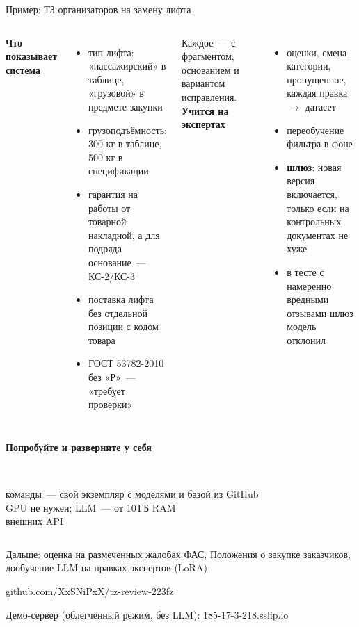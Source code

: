 \documentclass[aspectratio=169,11pt]{beamer}
\newcommand{\bignum}[1]{{\color{miptblue}\bfseries\Huge #1}}
\newcommand{\muted}[1]{{\color{miptgrey}#1}}
\begin{document}
\begin{frame}[shrink=4]{Пример: ТЗ организаторов на замену лифта}
  \begin{columns}[T]
    \small
    \textbf{Что показывает система}
    \begin{itemize}
      \item тип лифта: «пассажирский» в таблице, «грузовой» в предмете закупки
      \item грузоподъёмность: 300 кг в таблице, 500 кг в спецификации
      \item гарантия на работы от товарной накладной, а для подряда основание~— КС-2/КС-3
      \item поставка лифта без отдельной позиции с кодом товара
      \item ГОСТ 53782-2010 без «Р»~— \muted{«требует проверки»}
    \end{itemize}
    \muted{Каждое~— с фрагментом, основанием и вариантом исправления.}
    \small
    \textbf{Учится на экспертах}
    \begin{itemize}
      \item оценки, смена категории, пропущенное, каждая правка $\to$ датасет
      \item переобучение фильтра в фоне
      \item \textbf{шлюз}: новая версия включается, только если на контрольных документах не хуже
      \item в тесте с намеренно вредными отзывами шлюз модель \textcolor{mipterr}{отклонил}
    \end{itemize}
  \end{columns}
\end{frame}

\begin{frame}[plain]
  \centering
  \vspace{0.8cm}
  {\color{miptblue}\bfseries\huge Попробуйте и разверните у себя\par}
  \vspace{14pt}
  \begin{columns}[T]
    \centering\bignum{3}\\\muted{команды~— свой экземпляр с моделями и базой из GitHub}
    \centering\bignum{CPU}\\\muted{GPU не нужен; LLM~— от 10\,ГБ RAM}
    \centering\bignum{0}\\\muted{внешних API}
  \end{columns}
  \vspace{14pt}
  \small\muted{Дальше: оценка на размеченных жалобах ФАС, Положения о закупке заказчиков, дообучение LLM на правках экспертов (LoRA)}\\[10pt]
  {\Large\color{miptmid}\ttfamily github.com/XxSNiPxX/tz-review-223fz\par}
  \muted{\small Демо-сервер (облегчённый режим, без LLM): 185-17-3-218.sslip.io}
\end{frame}
\end{document}

